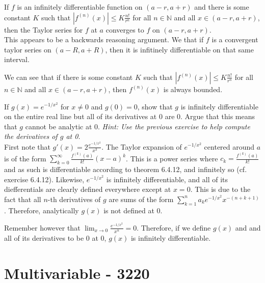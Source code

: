 \documentclass[12pt]{book}
\newcommand{\N}{\mathbb{N}}
\newenvironment{exercise}[2][Exercise]{\begin{trivlist}
\item[\hskip \labelsep {\bfseries #1}\hskip \labelsep {\bfseries #2.}]}{\end{trivlist}}
\begin{document}
\begin{exercise}{6.5.11}
If $f$ is an infinitely differentiable function on $(a-r,a+r)$ and there is some constant $K$ such that $\left| f^{(n)} (x)\right| \leq K \frac{n!}{r^n}$ for all $n \in \N$ and all $x \in (a-r,a+r)$, then the Taylor series for $f$ at $a$ converges to $f$ on $(a-r,a+r)$. \\

This appears to be a backwards reasoning argument. We that if $f$ is a convergent taylor series on $\left(a-R, a+R\right)$, then it is infitinely differentiable on that same interval.

We can see that if there is some constant $K$ such that $\left| f^{(n)} (x)\right| \leq K \frac{n!}{r^n}$ for all $n \in \N$ and all $x \in (a-r,a+r)$, then $f^{(n)}(x)$ is always bounded. 
\end{exercise}



\begin{exercise}{6.5.13}
If $g(x)=e^{-1/x^2}$ for $x \neq 0$ and $g(0)=0$, show that $g$ is infinitely differentiable on the entire real line but all of its derivatives at 0 are 0. Argue that this means that $g$ cannot be analytic at 0. \emph{Hint: Use the previous exercise to help compute the derivatives of $g$ at 0.} \\

First note that $g'(x)= 2 \frac{e^{-1/x^2}}{x^3}$. The Taylor expansion of $e^{-1/x^2}$ centered around $a$ is of the form $\sum_{k=0}^\infty \frac{f^{(k)}(a)}{k!} \left(x-a\right)^k$. This is a power series where $c_k=\frac{f^{(k)}(a)}{k!}$ and as such is differentiable according to theorem 6.4.12, and infinitely so (cf. exercise 6.4.12). Likewise, $e^{-1/x^2}$ is infinitely differentiable, and all of its diefferentials are clearly defined everywhere except at $x=0$. This is due to the fact that all $n$-th derivatives of $g$ are sums of the form $\sum_{k=1}^n a_k e^{-1/x^2} x^{-(n+k+1)}$. Therefore, analytically $g(x)$ is not defined at 0.

Remember however that $\lim_{x \to 0} \frac{e^{-1/x^2}}{x^n}=0$. Therefore, if we define $g(x)$ and and all of its derivatives to be 0 at 0, $g(x)$ is infinitely differentiable.
\end{exercise}



\part{Multivariable - 3220}
\end{document}
